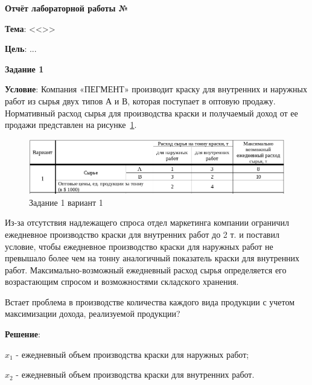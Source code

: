 \begin{center}
  \textbf{Отчёт лабораторной работы №\envReportLabNumber}
\end{center}

\textbf{Тема}:
<<\envReportTitle>>

\textbf{Цель}: ...


\begin{center}
  \textbf{Задание 1}
\end{center}

\textbf{Условие}:
Компания «ПЕГМЕНТ» производит краску для внутренних и наружных работ из сырья двух типов А и В,
которая поступает в оптовую продажу.
Нормативный расход сырья для производства краски и получаемый доход от ее продажи представлен на рисунке~\ref{fig:task1_1}.

\begin{figure}[!htb]
  \centering

  \includegraphics[width=16cm]
  {inc/task1_1.png}

  \caption{Задание 1 вариант 1}
  \label{fig:task1_1}
\end{figure}

Из-за отсутствия надлежащего спроса отдел маркетинга компании ограничил ежедневное производство краски для внутренних работ
до 2 т. и поставил условие,
чтобы ежедневное производство краски для наружных работ не превышало более чем на тонну
аналогичный показатель краски для внутренних работ.
Максимально-возможный ежедневный расход сырья определяется его возрастающим спросом и возможностями складского хранения.

Встает проблема в производстве количества каждого вида продукции с учетом максимизации дохода, реализуемой продукции?

\textbf{Решение}:

$x_1$ - ежедневный объем производства краски для наружных работ;

$x_2$ - ежедневный объем производства краски для внутренних работ.

